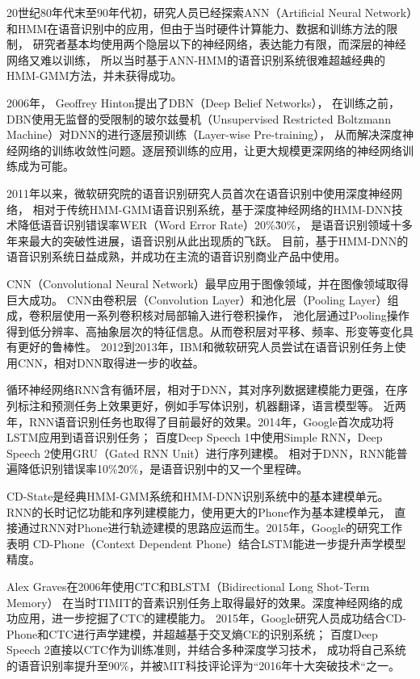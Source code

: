 20世纪80年代末至90年代初，研究人员已经探索ANN（Artificial Neural Network）和HMM在语音识别中的应用，但由于当时硬件计算能力、数据和训练方法的限制，
研究者基本均使用两个隐层以下的神经网络，表达能力有限，而深层的神经网络又难以训练，
所以当时基于ANN-HMM的语音识别系统很难超越经典的HMM-GMM方法，并未获得成功。

2006年， Geoffrey Hinton提出了DBN（Deep Belief Networks），
在训练之前，DBN使用无监督的受限制的玻尔兹曼机（Unsupervised Restricted Boltzmann Machine）对DNN的进行逐层预训练（Layer-wise Pre-training），
从而解决深度神经网络的训练收敛性问题。逐层预训练的应用，让更大规模更深网络的神经网络训练成为可能。

2011年以来，微软研究院的语音识别研究人员首次在语音识别中使用深度神经网络，
相对于传统HMM-GMM语音识别系统，基于深度神经网络的HMM-DNN技术降低语音识别错误率WER（Word Error Rate）20\%\~30\%，
是语音识别领域十多年来最大的突破性进展，语音识别从此出现质的飞跃。
目前，基于HMM-DNN的语音识别系统日益成熟，并成功在主流的语音识别商业产品中使用。


CNN（Convolutional Neural Network）最早应用于图像领域，并在图像领域取得巨大成功。
CNN由卷积层（Convolution Layer）和池化层（Pooling Layer）组成，卷积层使用一系列卷积核对局部输入进行卷积操作，
池化层通过Pooling操作得到低分辨率、高抽象层次的特征信息。从而卷积层对平移、频率、形变等变化具有更好的鲁棒性。
2012到2013年，IBM和微软研究人员尝试在语音识别任务上使用CNN，相对DNN取得进一步的收益。

循环神经网络RNN含有循环层，相对于DNN，其对序列数据建模能力更强，在序列标注和预测任务上效果更好，例如手写体识别，机器翻译，语言模型等。
近两年，RNN语音识别任务也取得了目前最好的效果。2014年，Google首次成功将LSTM应用到语音识别任务；
百度Deep Speech 1中使用Simple RNN，Deep Speech 2使用GRU（Gated RNN Unit）进行序列建模。
相对于DNN，RNN能普遍降低识别错误率10\%\~20\%，是语音识别中的又一个里程碑。

CD-State是经典HMM-GMM系统和HMM-DNN识别系统中的基本建模单元。RNN的长时记忆功能和序列建模能力，使用更大的Phone作为基本建模单元，
直接通过RNN对Phone进行轨迹建模的思路应运而生。2015年，Google的研究工作表明
CD-Phone（Context Dependent Phone）结合LSTM能进一步提升声学模型精度。

Alex Graves在2006年使用CTC和BLSTM（Bidirectional Long Shot-Term Memory）
在当时TIMIT的音素识别任务上取得最好的效果。深度神经网络的成功应用，进一步挖掘了CTC的建模能力。
2015年，Google研究人员成功结合CD-Phone和CTC进行声学建模，并超越基于交叉熵CE的识别系统；
百度Deep Speech 2直接以CTC作为训练准则，并结合多种深度学习技术，
成功将自己系统的语音识别率提升至90\%，并被MIT科技评论评为“2016年十大突破技术“之一。

